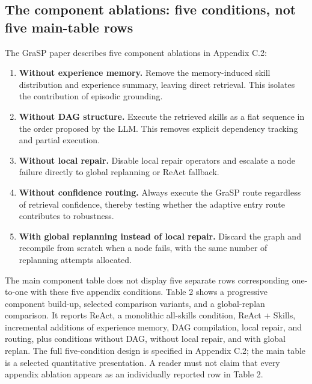 \subsection{The component ablations: five conditions, not five main-table rows}

The GraSP paper describes five component ablations in Appendix C.2:

\begin{enumerate}
  \item \textbf{Without experience memory.} Remove the memory-induced skill distribution and experience summary, leaving direct retrieval. This isolates the contribution of episodic grounding.
  \item \textbf{Without DAG structure.} Execute the retrieved skills as a flat sequence in the order proposed by the LLM. This removes explicit dependency tracking and partial execution.
  \item \textbf{Without local repair.} Disable local repair operators and escalate a node failure directly to global replanning or ReAct fallback.
  \item \textbf{Without confidence routing.} Always execute the GraSP route regardless of retrieval confidence, thereby testing whether the adaptive entry route contributes to robustness.
  \item \textbf{With global replanning instead of local repair.} Discard the graph and recompile from scratch when a node fails, with the same number of replanning attempts allocated.
\end{enumerate}

The main component table does not display five separate rows corresponding one-to-one with these five appendix conditions. Table 2 shows a progressive component build-up, selected comparison variants, and a global-replan comparison. It reports ReAct, a monolithic all-skills condition, ReAct + Skills, incremental additions of experience memory, DAG compilation, local repair, and routing, plus conditions without DAG, without local repair, and with global replan. The full five-condition design is specified in Appendix C.2; the main table is a selected quantitative presentation. A reader must not claim that every appendix ablation appears as an individually reported row in Table 2.\autocite{xia2026grasp}

